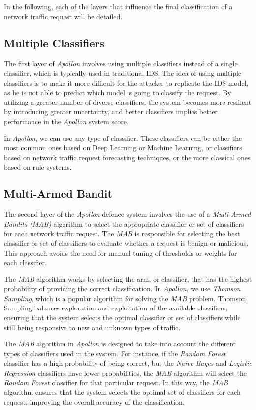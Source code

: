 In the following, each of the layers that influence the final classification of a network traffic request will be
detailed.


\subsection{Multiple Classifiers}\label{subsec:multiple-classifiers}
The first layer of \textit{Apollon} involves using multiple classifiers instead of a single classifier, which is typically used
in traditional IDS.
The idea of using multiple classifiers is to make it more difficult for the attacker to replicate the IDS model,
as he is not able to predict which model is going to classify the request.
By utilizing a greater number of diverse classifiers, the system becomes more resilient by introducing greater uncertainty,
and better classifiers implies better performance in the \textit{Apollon} system score.

In \textit{Apollon}, we can use any type of classifier.
These classifiers can be either the most common ones based on Deep Learning or Machine Learning, or classifiers based
on network traffic request forecasting techniques, or the more classical ones based on rule systems.

\subsection{Multi-Armed Bandit}\label{subsec:multi-armed-bandit}
The second layer of the \textit{Apollon} defence system involves the use of a \textit{Multi-Armed Bandits (MAB)} algorithm
to select the appropriate classifier or set of classifiers for each network traffic request.
The \textit{MAB} is responsible for selecting the best classifier or set of classifiers to evaluate whether a request is benign
or malicious.
This approach avoids the need for manual tuning of thresholds or weights for each classifier.

The \textit{MAB} algorithm works by selecting the arm, or classifier, that has the highest probability of providing the correct
classification.
In \textit{Apollon}, we use \textit{Thomson Sampling}, which is a popular algorithm for solving the \textit{MAB} problem.
Thomson Sampling balances exploration and exploitation of the available classifiers, ensuring that the system selects
the optimal classifier or set of classifiers while still being responsive to new and unknown types of traffic.

The \textit{MAB} algorithm in \textit{Apollon} is designed to take into account the different types of classifiers used in the system.
For instance, if the \textit{Random Forest} classifier has a high probability of being correct, but the \textit{Naive Bayes} and
\textit{Logistic Regression} classifiers have lower probabilities, the \textit{MAB} algorithm will select the \textit{Random Forest}
classifier for that particular request.
In this way, the \textit{MAB} algorithm ensures that the system selects the optimal set of classifiers for each request,
improving the overall accuracy of the classification.

